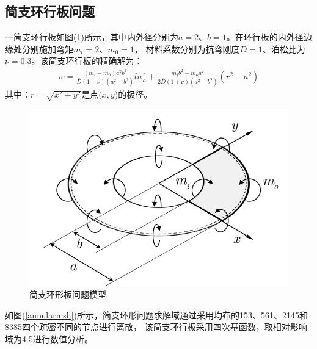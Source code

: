 \subsection{简支环行板问题}
一简支环行板如图(\ref{annular})所示，其中内外径分别为$a=2$、$b=1$。在环行板的内外径边缘处分别施加弯矩$m_i=2$、$m_0=1$，
材料系数分别为抗弯刚度$\bar{D}=1$、泊松比为$\nu=0.3$。该简支环行板的精确解为：
\begin{equation}
\begin{split}
    w=\frac{(m_i-m_0)a^2b^2}{\bar D(1-\nu)(a^2-b^2)}ln\frac{r}{a}+\frac{m_ib^2-m_oa^2}{2\bar D(1+\nu)(a^2-b^2)}(r^2-a^2)
\end{split}
\end{equation}
其中：$r=\sqrt{x^2+y^2}$是点($x,y$)的极径。\par
\begin{figure}[!h]
    \centering
    \includegraphics[scale=0.7]{figure/P/A/annular.png}
    \caption{简支环形板问题模型}\label{annular}
\end{figure}\newpage
如图(\ref{annularmsh})所示，简支环形问题求解域通过采用均布的153、561、2145和8385四个疏密不同的节点进行离散，
该简支环行板采用四次基函数，取相对影响域为4.5进行数值分析。\par

